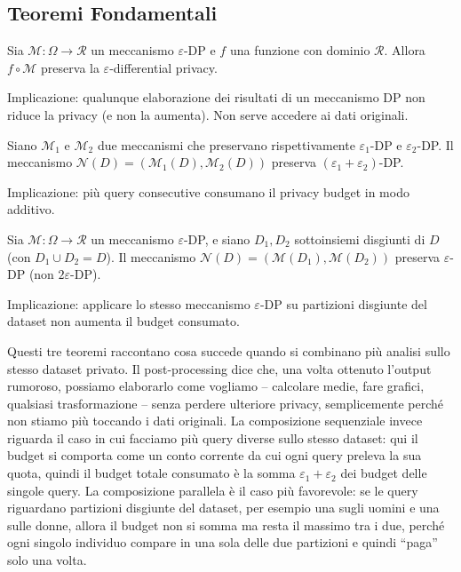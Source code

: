 \documentclass[a4paper,11pt]{article}
\begin{document}
\subsection{Teoremi Fondamentali}

\begin{teorema}
Sia $\mathcal{M}: \Omega \to \mathcal{R}$ un meccanismo $\varepsilon$-DP e $f$ una funzione con dominio $\mathcal{R}$. Allora $f \circ \mathcal{M}$ preserva la $\varepsilon$-differential privacy.

Implicazione: qualunque elaborazione dei risultati di un meccanismo DP non riduce la privacy (e non la aumenta). Non serve accedere ai dati originali.
\end{teorema}

\begin{teorema}[Composizione]
Siano $\mathcal{M}_1$ e $\mathcal{M}_2$ due meccanismi che preservano rispettivamente $\varepsilon_1$-DP e $\varepsilon_2$-DP. Il meccanismo $\mathcal{N}(D) = (\mathcal{M}_1(D), \mathcal{M}_2(D))$ preserva $(\varepsilon_1 + \varepsilon_2)$-DP.

Implicazione: pi\`{u} query consecutive consumano il privacy budget in modo additivo.
\end{teorema}

\begin{teorema}
Sia $\mathcal{M}: \Omega \to \mathcal{R}$ un meccanismo $\varepsilon$-DP, e siano $D_1, D_2$ sottoinsiemi disgiunti di $D$ (con $D_1 \cup D_2 = D$). Il meccanismo $\mathcal{N}(D) = (\mathcal{M}(D_1), \mathcal{M}(D_2))$ preserva $\varepsilon$-DP (non $2\varepsilon$-DP).

Implicazione: applicare lo stesso meccanismo $\varepsilon$-DP su partizioni disgiunte del dataset non aumenta il budget consumato.
\end{teorema}

\begin{nota}
Questi tre teoremi raccontano cosa succede quando si combinano più analisi sullo stesso dataset privato. Il post-processing dice che, una volta ottenuto l'output rumoroso, possiamo elaborarlo come vogliamo -- calcolare medie, fare grafici, qualsiasi trasformazione -- senza perdere ulteriore privacy, semplicemente perché non stiamo più toccando i dati originali. La composizione sequenziale invece riguarda il caso in cui facciamo più query diverse sullo stesso dataset: qui il budget si comporta come un conto corrente da cui ogni query preleva la sua quota, quindi il budget totale consumato è la somma $\varepsilon_1 + \varepsilon_2$ dei budget delle singole query. La composizione parallela è il caso più favorevole: se le query riguardano partizioni disgiunte del dataset, per esempio una sugli uomini e una sulle donne, allora il budget non si somma ma resta il massimo tra i due, perché ogni singolo individuo compare in una sola delle due partizioni e quindi ``paga'' solo una volta.
\end{nota}
\end{document}

